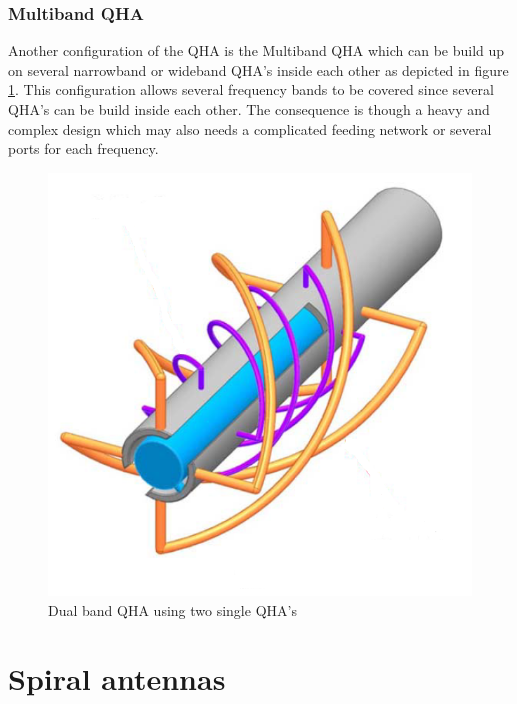 \subsubsection{Multiband QHA}
Another configuration of the QHA is the Multiband QHA \citep{Bai2014} which can be build up on several narrowband or wideband QHA's inside each other as depicted in figure \ref{fig:TB_QHA}. This configuration allows several frequency bands to be covered since several QHA's can be build inside each other. The consequence is though a heavy and complex design which may also needs a complicated feeding network or several ports for each frequency.  

\begin{figure}[H]
\centering 
\includegraphics[scale = 0.5]{figures/antennas/qha/dual_band}
\caption{Dual band QHA using two single QHA's \citep{Bai2014}}
\label{fig:TB_QHA}
\end{figure} 





\section{Spiral antennas}



